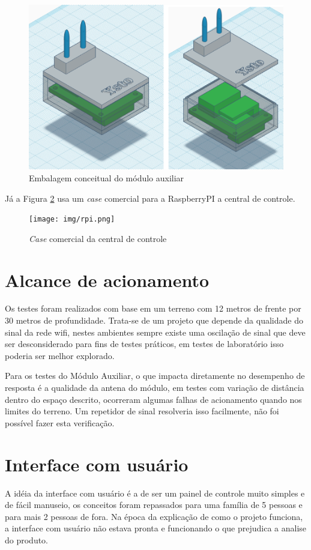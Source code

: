 \begin{figure}[H]
\caption{\label{prod-conceitual-01} Embalagem conceitual do módulo auxiliar}
\includegraphics[scale=0.35]{img/12-prod-conceitual.png}
\end{figure}

Já a Figura \ref{prod-rpi} usa um \textit{case} comercial para a RaspberryPI a central de controle.

\begin{figure}[H]
\caption{\label{prod-rpi} \textit{Case} comercial da central de controle}
\texttt{[image: img/rpi.png]}
\end{figure}


\section{Alcance de acionamento}
Os testes foram realizados com base em um terreno com 12 metros de frente por 30 metros de profundidade. Trata-se de um projeto que depende da qualidade do sinal da rede wifi, nestes ambientes sempre existe uma oscilação de sinal que deve ser desconsiderado para fins de testes práticos, em testes de laboratório isso poderia ser melhor explorado.

Para os testes do Módulo Auxiliar, o que impacta diretamente no desempenho de resposta é a qualidade da antena do módulo, em testes com variação de distância dentro do espaço descrito, ocorreram algumas falhas de acionamento quando nos limites do terreno. Um repetidor de sinal resolveria isso facilmente, não foi possível fazer esta verificação.

\section{Interface com usuário}
A idéia da interface com usuário é a de ser um painel de controle muito simples e de fácil manuseio, os conceitos foram repassados para uma família de 5 pessoas e para mais 2 pessoas de fora. Na época da explicação de como o projeto funciona, a interface com usuário não estava pronta e funcionando o que prejudica a analise do produto.


